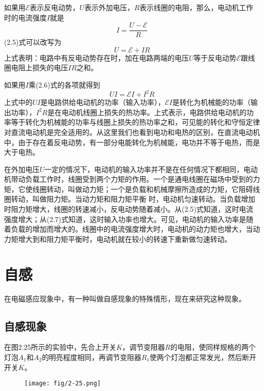 如果用$\mathcal{E}$表示反电动势，$U$表示外加电压，$R$表示线圈的电阻，那么，电动机工作时的电流强度$I$就是
\begin{equation}
    I=\frac{U-\mathcal{E}}{R}
\end{equation}
(2.5)式可以改写为
\begin{equation}
    U=\mathcal{E}+IR
\end{equation}
上式表明：电路中有反电动势存在时，加在电路两端的电压$U$等于反电动势$\mathcal{E}$跟线圈电阻上损失的电压$IR$之和。

如果用$I$乘(2.6)式的各项就得到
\begin{equation}
    UI=\mathcal{E}I+I^2R
\end{equation}
上式中的$UI$是电路供给电动机的功率（输入功率），$\mathcal{E}I$是转化为机械能的功率（输出功率），$I^2R$是在电动机线圈上损失的热功率。上式表示，电路供给电动机的功率等于转化为机械能的功率与线圈上损失的热功率之和，可见能的转化和守恒定律对直流电动机是完全适用的。从这里我们也看到电功和电热的区别，在直流电动机中，由于存在着反电动势，有一部分电能转化为机械能，电功并不等于电热，而是大于电热。

在外加电压$U$一定的情况下，电动机的输入功率并不是在任何情况下都相同，电动机带动负载工作时，线圈受到两个力矩的作用。一个是通电线圈在磁场中受到的力矩，它使线圈转动，叫做动力矩；一个是负载和机械摩擦所造成的力矩，它阻碍线圈转动，叫做阻力矩。当动力矩和阻力矩平衡
时，电动机匀速转动。当负载增加时阻力矩增大，线圈的转速减小，反电动势随着减小。从(2.5)式知道，这时电流强度增大；从(2.7)式知道，这时输入功率也增大。可见，电动机的输入功率是随着负载的增加而增大的。线圈中的电流强度增大时，电动机的动力矩也增大，当动力矩增大到和阻力矩平衡时，电动机就在较小的转速下重新做匀速转动。

\section{自感}
在电磁感应现象中，有一种叫做自感现象的特殊情形，现在来研究这种现象。

\subsection{自感现象}

在图2.25所示的实验中，先合上开关$K$，调节变阻器$R$的电阻，使同样规格的两个灯泡$A_1$和$A_2$的明亮程度相同，再调节变阻器$R_1$使两个灯泡都正常发光，然后断开开关$K$。
\begin{figure}[htp]\centering
\texttt{[image: fig/2-25.png]}
\caption{}
\end{figure}

